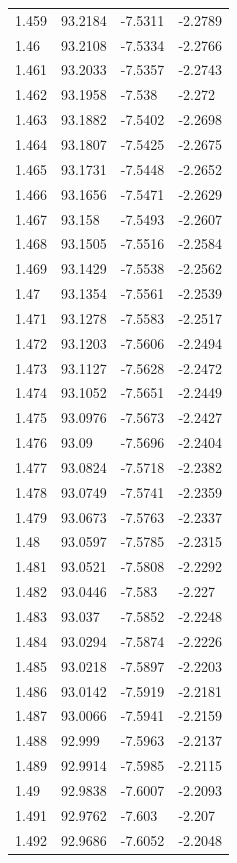 \begin{tabular}{llll}
1.459 & 93.2184 & -7.5311 & -2.2789 \\
1.46 & 93.2108 & -7.5334 & -2.2766 \\
1.461 & 93.2033 & -7.5357 & -2.2743 \\
1.462 & 93.1958 & -7.538 & -2.272 \\
1.463 & 93.1882 & -7.5402 & -2.2698 \\
1.464 & 93.1807 & -7.5425 & -2.2675 \\
1.465 & 93.1731 & -7.5448 & -2.2652 \\
1.466 & 93.1656 & -7.5471 & -2.2629 \\
1.467 & 93.158 & -7.5493 & -2.2607 \\
1.468 & 93.1505 & -7.5516 & -2.2584 \\
1.469 & 93.1429 & -7.5538 & -2.2562 \\
1.47 & 93.1354 & -7.5561 & -2.2539 \\
1.471 & 93.1278 & -7.5583 & -2.2517 \\
1.472 & 93.1203 & -7.5606 & -2.2494 \\
1.473 & 93.1127 & -7.5628 & -2.2472 \\
1.474 & 93.1052 & -7.5651 & -2.2449 \\
1.475 & 93.0976 & -7.5673 & -2.2427 \\
1.476 & 93.09 & -7.5696 & -2.2404 \\
1.477 & 93.0824 & -7.5718 & -2.2382 \\
1.478 & 93.0749 & -7.5741 & -2.2359 \\
1.479 & 93.0673 & -7.5763 & -2.2337 \\
1.48 & 93.0597 & -7.5785 & -2.2315 \\
1.481 & 93.0521 & -7.5808 & -2.2292 \\
1.482 & 93.0446 & -7.583 & -2.227 \\
1.483 & 93.037 & -7.5852 & -2.2248 \\
1.484 & 93.0294 & -7.5874 & -2.2226 \\
1.485 & 93.0218 & -7.5897 & -2.2203 \\
1.486 & 93.0142 & -7.5919 & -2.2181 \\
1.487 & 93.0066 & -7.5941 & -2.2159 \\
1.488 & 92.999 & -7.5963 & -2.2137 \\
1.489 & 92.9914 & -7.5985 & -2.2115 \\
1.49 & 92.9838 & -7.6007 & -2.2093 \\
1.491 & 92.9762 & -7.603 & -2.207 \\
1.492 & 92.9686 & -7.6052 & -2.2048 \\

\end{tabular}

